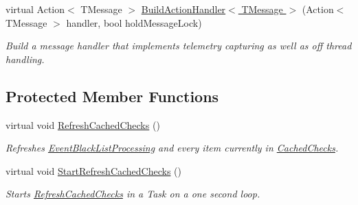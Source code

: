 \begin{DoxyCompactItemize}
virtual Action$<$ T\+Message $>$ \hyperlink{classCqrs_1_1Bus_1_1BusHelper_a6dc1f5166b7bcd13aa7a0d5e25ded295_a6dc1f5166b7bcd13aa7a0d5e25ded295}{Build\+Action\+Handler$<$ T\+Message $>$} (Action$<$ T\+Message $>$ handler, bool hold\+Message\+Lock)
\begin{DoxyCompactList}\small\item\em Build a message handler that implements telemetry capturing as well as off thread handling. \end{DoxyCompactList}\end{DoxyCompactItemize}
\subsection*{Protected Member Functions}
\begin{DoxyCompactItemize}
\item 
virtual void \hyperlink{classCqrs_1_1Bus_1_1BusHelper_ad589391a51cd61673d2403ee8012e713_ad589391a51cd61673d2403ee8012e713}{Refresh\+Cached\+Checks} ()
\begin{DoxyCompactList}\small\item\em Refreshes \hyperlink{classCqrs_1_1Bus_1_1BusHelper_ae8d3525369ee9572de06f935cc09510b_ae8d3525369ee9572de06f935cc09510b}{Event\+Black\+List\+Processing} and every item currently in \hyperlink{classCqrs_1_1Bus_1_1BusHelper_ae29e80bd315b6284509c9fd0b977d2a0_ae29e80bd315b6284509c9fd0b977d2a0}{Cached\+Checks}. \end{DoxyCompactList}\item 
virtual void \hyperlink{classCqrs_1_1Bus_1_1BusHelper_a23bfab1be70af651cc48033fcdf4ce2c_a23bfab1be70af651cc48033fcdf4ce2c}{Start\+Refresh\+Cached\+Checks} ()
\begin{DoxyCompactList}\small\item\em Starts \hyperlink{classCqrs_1_1Bus_1_1BusHelper_ad589391a51cd61673d2403ee8012e713_ad589391a51cd61673d2403ee8012e713}{Refresh\+Cached\+Checks} in a Task on a one second loop. \end{DoxyCompactList}\end{DoxyCompactItemize}
